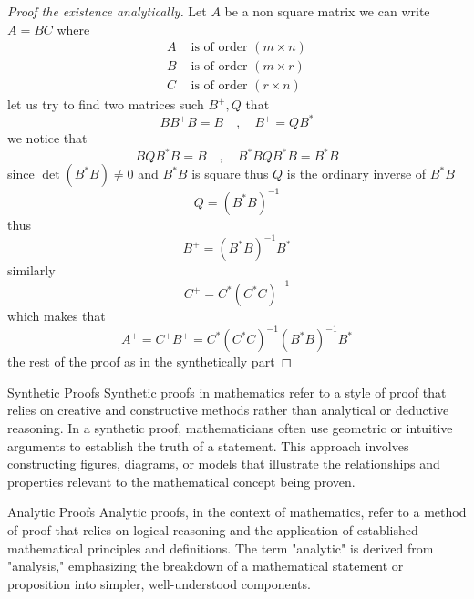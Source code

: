 \documentclass[]{article}
\begin{document}
\begin{proof}[Proof the existence analytically]
        Let $A$ be a non square matrix we can write $A = BC$ where
        \begin{align*}
                A &\text{ is of order } (m\times n)
                \\
                B &\text{ is of order } (m\times r)
                \\
                C &\text{ is of order } (r\times n)
        \end{align*}
        let us try to find two matrices such $B^{+} , Q$ that 
        \[
        BB^{+} B = B \quad,\quad B^{+} = QB^*
        \]
        we notice that 
        \[
        BQB^{*}B = B \quad,\quad B^{*}BQB^{*}B = B^{*}B
        \]
        since $\det(B^{*}B) \neq 0$ and $B^{*}B$ is square thus $Q$ is the ordinary inverse of $B^{*}B$
        \[
        Q = {(B^{*}B)}^{-1}
        \]
        thus 
        \[
        B^{+} = {(B^{*}B)}^{-1}B^*  
        \]
        similarly
        \[
        C^{+} = C^*{(C^{*}C)}^{-1}
        \]
        which makes that 
        \[
        A^{+}  = C^{+}B^{+}= C^*{(C^{*}C)}^{-1}{(B^{*}B)}^{-1}B^*
        \]
        the rest of the proof as in the synthetically part 
\end{proof}
\begin{enrichment*}{Synthetic Proofs}
        Synthetic proofs in mathematics refer to a style of proof that relies on creative and constructive methods rather than analytical or deductive reasoning. In a synthetic proof, mathematicians often use geometric or intuitive arguments to establish the truth of a statement. This approach involves constructing figures, diagrams, or models that illustrate the relationships and properties relevant to the mathematical concept being proven.
\end{enrichment*}
\begin{enrichment*}{Analytic Proofs}
        Analytic proofs, in the context of mathematics, refer to a method of proof that relies on logical reasoning and the application of established mathematical principles and definitions. The term "analytic" is derived from "analysis," emphasizing the breakdown of a mathematical statement or proposition into simpler, well-understood components.
\end{enrichment*}

\end{document}
